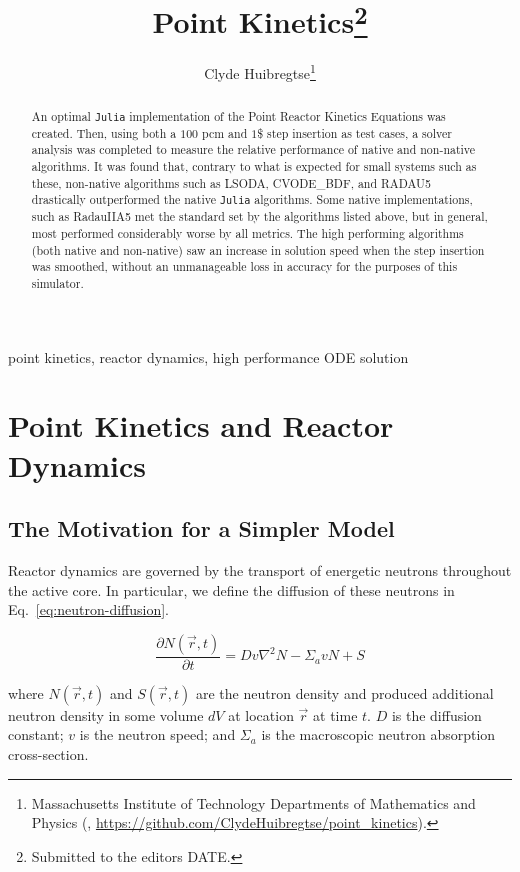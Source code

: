 \documentclass[review,onefignum,onetabnum]{siamart171218}
\title{Point Kinetics\thanks{Submitted to the editors DATE.}}
\author{Clyde Huibregtse\thanks{Massachusetts Institute of Technology Departments of Mathematics and Physics
  (\email{huibregc@mit.edu}, \url{https://github.com/ClydeHuibregtse/point_kinetics}).}}
\begin{document}
\maketitle

\begin{abstract}
An optimal \texttt{Julia} implementation of the Point Reactor Kinetics Equations
was created. Then, using both a $100$ pcm and $1$\$ step insertion as test
cases, a solver analysis was completed to measure the relative performance of native
and non-native algorithms. It was found that, contrary to what is expected for small
systems such as these, non-native algorithms such as LSODA, CVODE\_BDF, and RADAU5
drastically outperformed the native \texttt{Julia} algorithms. Some native implementations,
such as RadauIIA5 met the standard set by the algorithms listed above, but in general,
most performed considerably worse by all metrics. The high performing algorithms (both
native and non-native) saw an increase in solution speed when the step insertion was
smoothed, without an unmanageable loss in accuracy for the purposes of this simulator.
\end{abstract}

\begin{keywords}
  point kinetics, reactor dynamics, high performance ODE solution
\end{keywords}


\section{Point Kinetics and Reactor Dynamics}

\subsection{The Motivation for a Simpler Model}
Reactor dynamics are governed by the transport of energetic neutrons
throughout the active core. In particular, we define the diffusion
of these neutrons in Eq.~\cref{eq:neutron-diffusion}.

\begin{equation}
  \label{eq:neutron-diffusion}
  \frac{\partial N(\vec{r}, t)}{\partial t} = Dv\nabla^2N - \Sigma_a v N + S
\end{equation}

where $N(\vec{r}, t)$ and $S(\vec{r}, t)$ are the neutron density and produced
additional neutron density in some volume $dV$ at location
$\vec{r}$ at time $t$.  $D$ is the diffusion constant; $v$ is the neutron
speed; and $\Sigma_a$ is the macroscopic neutron absorption cross-section.\cite{Dynamics} \\
\end{document}
